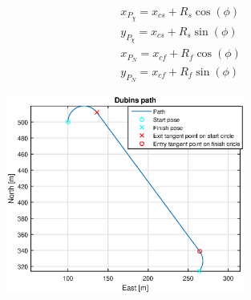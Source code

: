 \begin{subequations}
\begin{align}
& x_{P_\chi} = x_{cs} + R_s\cos(\phi) \\
& y_{P_\chi} = x_{cs} + R_s\sin(\phi) \\
& x_{P_N} = x_{cf} + R_f\cos(\phi) \\
& y_{P_N} = x_{cf} + R_f\sin(\phi)
\end{align}
\end{subequations}
\begin{figure}[H]
\includegraphics[width=0.7\textwidth]{figs/TheoryPlot/DubinsPath.eps}
\end{figure}